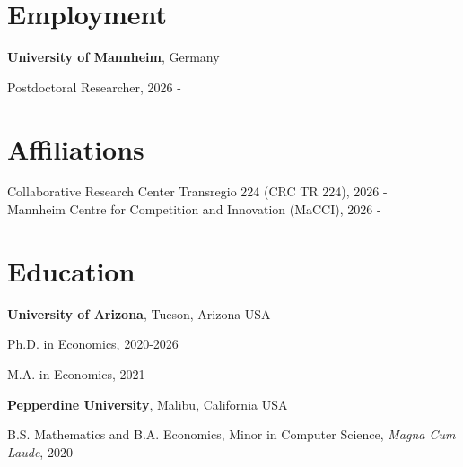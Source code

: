 \documentclass[margin,line]{res}
\newenvironment{list1}{
  \begin{list}{\ding{113}}{%
      \setlength{\itemsep}{0in}
      \setlength{\parsep}{0in} \setlength{\parskip}{0in}
      \setlength{\topsep}{0in} \setlength{\partopsep}{0in} 
      \setlength{\leftmargin}{0.17in}}}{\end{list}}
\begin{document}
\begin{resume}

\section{\sc Employment}
{\bf University of Mannheim}, Germany \\
\begin{list1}
\item[] Postdoctoral Researcher, 2026 - 
\end{list1}
\section{\sc Affiliations}
Collaborative Research Center Transregio 224 (CRC TR 224), 2026 - \\
Mannheim Centre for Competition and Innovation (MaCCI), 2026 - 

\section{\sc Education}
{\bf University of Arizona}, Tucson, Arizona USA\\
\vspace*{-.1in}
\begin{list1}
\item[] Ph.D. in Economics, 2020-2026 
\vspace*{.05in}
\item[] M.A. in Economics, 2021
\end{list1}

{\bf Pepperdine University}, Malibu, California USA\\
\vspace*{-.1in}
\begin{list1}
\item[] B.S. Mathematics and B.A. Economics, Minor in Computer Science, \textit{Magna Cum Laude}, 2020
\end{list1}


\end{resume}
\end{document}

